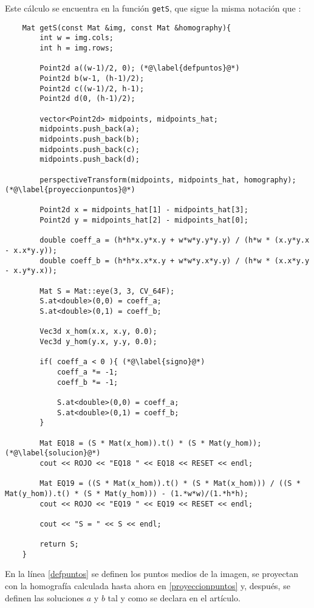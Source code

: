 \documentclass[a4paper, 11pt]{article}
\theoremstyle{definition}
\begin{document}
    Este cálculo se encuentra en la función \lstinline{getS}, que sigue la misma notación que \cite{LoopZhang}:
    \begin{lstlisting}
    Mat getS(const Mat &img, const Mat &homography){
        int w = img.cols;
        int h = img.rows;

        Point2d a((w-1)/2, 0); (*@\label{defpuntos}@*)
        Point2d b(w-1, (h-1)/2);
        Point2d c((w-1)/2, h-1);
        Point2d d(0, (h-1)/2);

        vector<Point2d> midpoints, midpoints_hat;
        midpoints.push_back(a);
        midpoints.push_back(b);
        midpoints.push_back(c);
        midpoints.push_back(d);

        perspectiveTransform(midpoints, midpoints_hat, homography); (*@\label{proyeccionpuntos}@*)

        Point2d x = midpoints_hat[1] - midpoints_hat[3];
        Point2d y = midpoints_hat[2] - midpoints_hat[0];

        double coeff_a = (h*h*x.y*x.y + w*w*y.y*y.y) / (h*w * (x.y*y.x - x.x*y.y));
        double coeff_b = (h*h*x.x*x.y + w*w*y.x*y.y) / (h*w * (x.x*y.y - x.y*y.x));

        Mat S = Mat::eye(3, 3, CV_64F);
        S.at<double>(0,0) = coeff_a;
        S.at<double>(0,1) = coeff_b;

        Vec3d x_hom(x.x, x.y, 0.0);
        Vec3d y_hom(y.x, y.y, 0.0);

        if( coeff_a < 0 ){ (*@\label{signo}@*)
            coeff_a *= -1;
            coeff_b *= -1;

            S.at<double>(0,0) = coeff_a;
            S.at<double>(0,1) = coeff_b;
        }

        Mat EQ18 = (S * Mat(x_hom)).t() * (S * Mat(y_hom)); (*@\label{solucion}@*)
        cout << ROJO << "EQ18 " << EQ18 << RESET << endl;

        Mat EQ19 = ((S * Mat(x_hom)).t() * (S * Mat(x_hom))) / ((S * Mat(y_hom)).t() * (S * Mat(y_hom))) - (1.*w*w)/(1.*h*h);
        cout << ROJO << "EQ19 " << EQ19 << RESET << endl;

        cout << "S = " << S << endl;

        return S;
    }
    \end{lstlisting}

    En la línea \ref{defpuntos} se definen los puntos medios de la imagen, se proyectan con la homografía calculada hasta ahora en \ref{proyeccionpuntos} y, después, se definen las soluciones $a$ y $b$ tal y como se declara en el artículo.
\end{document}

